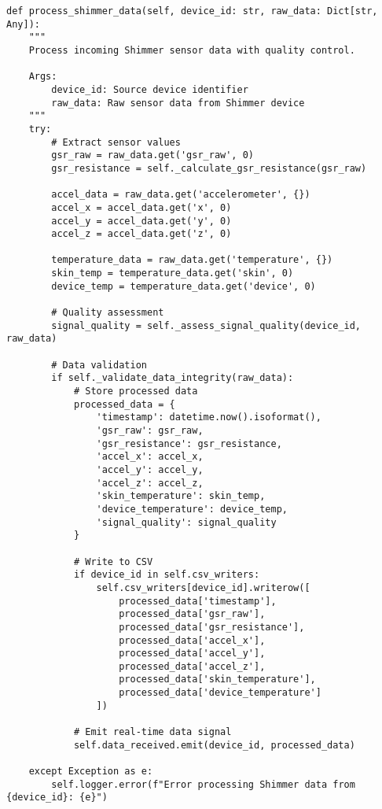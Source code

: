 \documentclass[11pt,a4paper]{article}
\begin{document}
\begin{verbatim}
def process_shimmer_data(self, device_id: str, raw_data: Dict[str, Any]):
    """
    Process incoming Shimmer sensor data with quality control.

    Args:
        device_id: Source device identifier
        raw_data: Raw sensor data from Shimmer device
    """
    try:
        # Extract sensor values
        gsr_raw = raw_data.get('gsr_raw', 0)
        gsr_resistance = self._calculate_gsr_resistance(gsr_raw)

        accel_data = raw_data.get('accelerometer', {})
        accel_x = accel_data.get('x', 0)
        accel_y = accel_data.get('y', 0)
        accel_z = accel_data.get('z', 0)

        temperature_data = raw_data.get('temperature', {})
        skin_temp = temperature_data.get('skin', 0)
        device_temp = temperature_data.get('device', 0)

        # Quality assessment
        signal_quality = self._assess_signal_quality(device_id, raw_data)

        # Data validation
        if self._validate_data_integrity(raw_data):
            # Store processed data
            processed_data = {
                'timestamp': datetime.now().isoformat(),
                'gsr_raw': gsr_raw,
                'gsr_resistance': gsr_resistance,
                'accel_x': accel_x,
                'accel_y': accel_y,
                'accel_z': accel_z,
                'skin_temperature': skin_temp,
                'device_temperature': device_temp,
                'signal_quality': signal_quality
            }

            # Write to CSV
            if device_id in self.csv_writers:
                self.csv_writers[device_id].writerow([
                    processed_data['timestamp'],
                    processed_data['gsr_raw'],
                    processed_data['gsr_resistance'],
                    processed_data['accel_x'],
                    processed_data['accel_y'],
                    processed_data['accel_z'],
                    processed_data['skin_temperature'],
                    processed_data['device_temperature']
                ])

            # Emit real-time data signal
            self.data_received.emit(device_id, processed_data)

    except Exception as e:
        self.logger.error(f"Error processing Shimmer data from {device_id}: {e}")
\end{verbatim}
\end{document}
